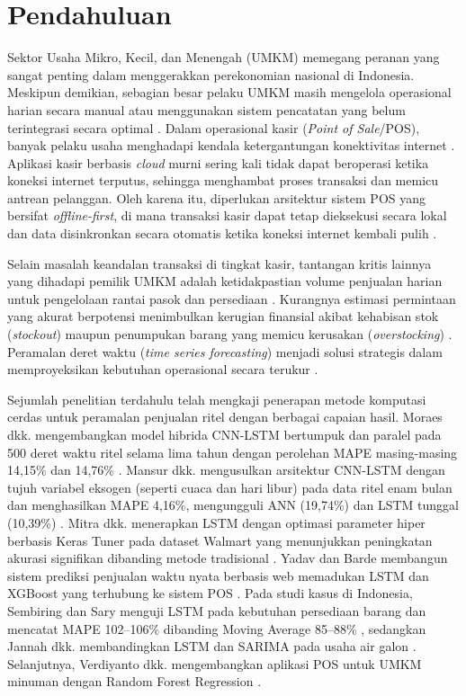 \documentclass[10pt,a4paper]{article}
\begin{document}
\section{Pendahuluan}

Sektor Usaha Mikro, Kecil, dan Menengah (UMKM) memegang peranan yang sangat penting dalam menggerakkan perekonomian nasional di Indonesia. Meskipun demikian, sebagian besar pelaku UMKM masih mengelola operasional harian secara manual atau menggunakan sistem pencatatan yang belum terintegrasi secara optimal \cite{sipayung2020}. Dalam operasional kasir (\textit{Point of Sale}/POS), banyak pelaku usaha menghadapi kendala ketergantungan konektivitas internet \cite{siddik2020}. Aplikasi kasir berbasis \textit{cloud} murni sering kali tidak dapat beroperasi ketika koneksi internet terputus, sehingga menghambat proses transaksi dan memicu antrean pelanggan. Oleh karena itu, diperlukan arsitektur sistem POS yang bersifat \textit{offline-first}, di mana transaksi kasir dapat tetap dieksekusi secara lokal dan data disinkronkan secara otomatis ketika koneksi internet kembali pulih \cite{flutter2026}.

Selain masalah keandalan transaksi di tingkat kasir, tantangan kritis lainnya yang dihadapi pemilik UMKM adalah ketidakpastian volume penjualan harian untuk pengelolaan rantai pasok dan persediaan \cite{hyndman2021}. Kurangnya estimasi permintaan yang akurat berpotensi menimbulkan kerugian finansial akibat kehabisan stok (\textit{stockout}) maupun penumpukan barang yang memicu kerusakan (\textit{overstocking}) \cite{box2015}. Peramalan deret waktu (\textit{time series forecasting}) menjadi solusi strategis dalam memproyeksikan kebutuhan operasional secara terukur \cite{hyndman2006}.

Sejumlah penelitian terdahulu telah mengkaji penerapan metode komputasi cerdas untuk peramalan penjualan ritel dengan berbagai capaian hasil. Moraes dkk. mengembangkan model hibrida CNN-LSTM bertumpuk dan paralel pada 500 deret waktu ritel selama lima tahun dengan perolehan MAPE masing-masing 14,15\% dan 14,76\% \cite{moraes2024}. Mansur dkk. mengusulkan arsitektur CNN-LSTM dengan tujuh variabel eksogen (seperti cuaca dan hari libur) pada data ritel enam bulan dan menghasilkan MAPE 4,16\%, mengungguli ANN (19,74\%) dan LSTM tunggal (10,39\%) \cite{mansur2025}. Mitra dkk. menerapkan LSTM dengan optimasi parameter hiper berbasis Keras Tuner pada dataset Walmart yang menunjukkan peningkatan akurasi signifikan dibanding metode tradisional \cite{mitra2024}. Yadav dan Barde membangun sistem prediksi penjualan waktu nyata berbasis web memadukan LSTM dan XGBoost yang terhubung ke sistem POS \cite{yadav2025}. Pada studi kasus di Indonesia, Sembiring dan Sary menguji LSTM pada kebutuhan persediaan barang dan mencatat MAPE 102--106\% dibanding Moving Average 85--88\% \cite{sembiring2025}, sedangkan Jannah dkk. membandingkan LSTM dan SARIMA pada usaha air galon \cite{jannah2025}. Selanjutnya, Verdiyanto dkk. mengembangkan aplikasi POS untuk UMKM minuman dengan Random Forest Regression \cite{verdiyanto2025}.
\end{document}
